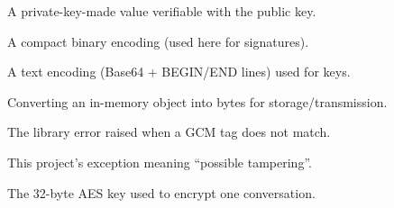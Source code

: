 \documentclass[11pt,a4paper]{article}
\begin{document}
\begin{description}[style=nextline,leftmargin=0pt]
  \item[Digital signature] A private-key-made value verifiable with the public key.
  \item[DER] A compact binary encoding (used here for signatures).
  \item[PEM] A text encoding (Base64 + BEGIN/END lines) used for keys.
  \item[Serialization] Converting an in-memory object into bytes for storage/transmission.
  \item[InvalidTag] The library error raised when a GCM tag does not match.
  \item[DecryptionError] This project's exception meaning ``possible tampering''.
  \item[Session key] The 32-byte AES key used to encrypt one conversation.
\end{description}

\end{document}
